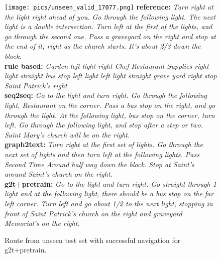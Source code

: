 \documentclass[11pt,a4paper]{article}
\begin{document}
\begin{figure*}[h]
    \texttt{[image: pics/unseen\_valid\_17077.png]}
    \scriptsize
    \textbf{reference:} \textit{Turn right at the light right ahead of you. Go through the following light. The next light is a double intersection. Turn left at the first of the lights, and go through the second one. Pass a graveyard on the right and stop at the end of it, right as the church starts. It's about 2/3 down the block.} \\
    \textbf{rule based:} \textit{Garden left light right Chef Restaurant Supplies right light straight bus stop left light left light straight grave yard right stop Saint Patrick's right}\\
    \textbf{seq2seq:} \textit{Go to the light and turn right. Go through the following light, Restaurant on the corner. Pass a bus stop on the right, and go through the light. At the following light, bus stop on the corner, turn left. Go through the following light, and stop after a step or two. Saint Mary's church will be on the right.}\\
    \textbf{graph2text:} \textit{Turn right at the first set of lights. Go through the next set of lights and then turn left at the following lights. Pass Second Time Around half way down the block. Stop at Saint's around Saint's church on the right.}\\
    \textbf{g2t+pretrain:} \textit{Go to the light and turn right. Go straight through 1 light and at the following light, there should be a bus stop on the far left corner. Turn left and go about 1/2 to the next light, stopping in front of Saint Patrick's church on the right and graveyard Memorial's on the right.}
    \caption{Route from unseen test set with successful navigation for g2t+pretrain.}
\end{figure*}
\end{document}
